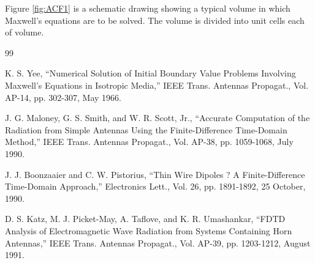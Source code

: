 Figure \ref{fig:ACF1} is a schematic drawing showing a typical volume in which Maxwell's equations are to be solved. The volume is divided into unit cells each of volume. 

\begin{thebibliography}{99}

  K. S. Yee, ``Numerical Solution of Initial Boundary Value Problems Involving Maxwell's Equations in Isotropic Media,'' IEEE Trans. Antennas Propagat., Vol. AP-14, pp. 302-307, May 1966.

 J. G. Maloney, G. S. Smith, and W. R. Scott, Jr., ``Accurate Computation of the Radiation from Simple Antennas Using the Finite-Difference Time-Domain Method,'' IEEE Trans. Antennas Propagat., Vol. AP-38, pp. 1059-1068, July 1990.

 J. J. Boonzaaier and C. W. Pistorius, ``Thin Wire Dipoles ? A Finite-Difference Time-Domain Approach,'' Electronics Lett., Vol. 26, pp. 1891-1892, 25 October, 1990.

 D. S. Katz, M. J. Picket-May, A. Taflove, and K. R. Umashankar, ``FDTD Analysis of Electromagnetic Wave Radiation from Systems Containing Horn Antennas,'' IEEE Trans. Antennas Propagat., Vol. AP-39, pp. 1203-1212, August 1991.

\end{thebibliography}



